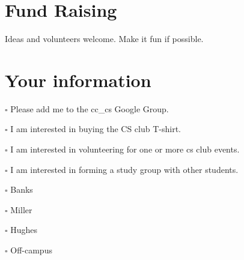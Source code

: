\newpage


\section{Fund Raising}
\label{sec:orgheadline16}

Ideas and volunteers welcome. Make it fun if possible.


\newpage


\section{Your information}
\label{sec:orgheadline17}

\begin{description}
\item[{Name:}] 

\item[{Email:}] 

\item[{Major:}] 

\item[{Year in school:}] 

\item $\square$ Please add me to the cc\_cs Google Group.
\item $\square$ I am interested in buying the CS club T-shirt.
\item $\square$ I am interested in volunteering for one or more cs club events.
\item $\square$ I am interested in forming a study group with other students.

\item[{Dorm:}] 
\item $\square$ Banks
\item $\square$ Miller
\item $\square$ Hughes
\item $\square$ Off-campus
\end{description}




